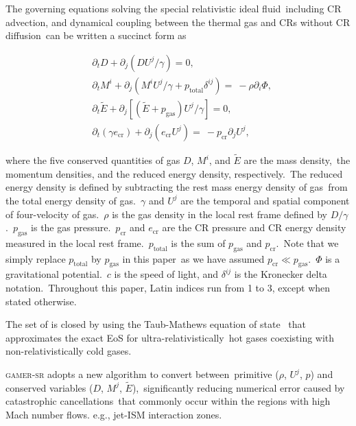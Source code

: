 \documentclass[twocolumn]{aastex631}
\begin{document}
  The governing equations solving the special relativistic ideal fluid\
  including CR advection, and dynamical coupling between the thermal gas and CRs without CR diffusion\
  can be written a succinct form as


  \begin{subequations}
    \label{governing-eq}
    \begin{align}
     &\partial_{t} D+\partial_{j} \left(DU^{j}/\gamma\right)=0,\label{D evolution}\\
     &\partial_{t} M^{i}+\partial_{j} \left(M^{i}U^{j}/\gamma+p_{\text{total}}\delta^{ij}\right)=\
     -\rho\partial_{i}\Phi,\label{M evolution}\\
     &\partial_{t} \tilde{E}+\partial_j \left[\left(\tilde{E}+p_{\text{gas}}\right)U^{j}/\gamma\right]=0, \label{E evoltion}\\
     &\partial_{t} \left(\gamma e_{\text{cr}}\right) + \partial_{j} \left(e_{\text{cr}}U^{j}\right)=\
     -p_{\text{cr}} \partial_{j} U^{j},\label{D evolution}
    \end{align}
  \end{subequations}


  where the five conserved quantities of gas $D$, $M^{i}$, and $\tilde{E}$ are the mass density,\
  the momentum densities, and the reduced energy density, respectively.\
  The reduced energy density is defined by subtracting the rest mass energy density of gas\
  from the total energy density of gas.\
  $\gamma$ and $U^{j}$ are the temporal and spatial component of four-velocity of gas.\
  $\rho$ is the gas density in the local rest frame defined by $D/\gamma$.\
  $p_{\text{gas}}$ is the gas pressure.\
  $p_{\text{cr}}$ and $e_{\text{cr}}$ are the CR pressure and CR energy density measured in the local rest frame.\
  $p_{\text{total}}$ is the sum of $p_{\text{gas}}$ and $p_{\text{cr}}$.\
  Note that we simply replace $p_{\text{total}}$ by $p_{\text{gas}}$ in this paper\
  as we have assumed $p_{\text{cr}}\ll p_{\text{gas}}$.\
  $\Phi$ is a gravitational potential.\
  $c$ is the speed of light, and $\delta^{ij}$ is the Kronecker delta notation.\
  Throughout this paper, Latin indices run from 1 to 3, except when stated otherwise.\

  The set of  is closed by using the Taub-Mathews equation of state \citep{Taub,TM_EOS}\
  that approximates the exact EoS \citep{Synge} for ultra-relativistically\
  hot gases coexisting with non-relativistically cold gases.

  \textsc{gamer-sr} adopts a new algorithm \citep{tseng2021} to convert between\
  primitive ($\rho$, $U^{j}$, $p$) and conserved variables ($D$, $M^{j}$, $\tilde{E}$),\
  significantly reducing numerical error caused by catastrophic cancellations\
  that commonly occur within the regions with high Mach number flows. e.g., jet-ISM interaction zones.
\end{document}
